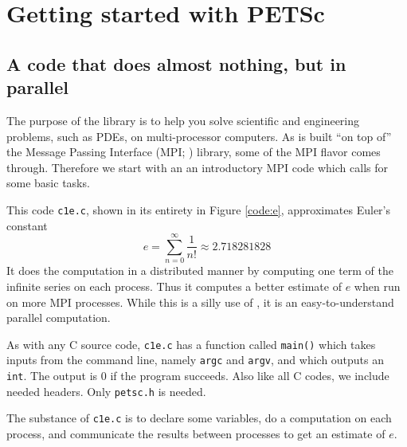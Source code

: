 
\chapter{Getting started with PETSc}
\label{chap:getstarted}

\section{A code that does almost nothing, but in parallel}

The purpose of the \PETSc library is to help you solve scientific and engineering problems, such as PDEs, on multi-processor computers.  As \PETSc is built ``on top of'' the Message Passing Interface (MPI; \citep{Groppetal1999}) library, some of the MPI flavor comes through.  Therefore we start with an an introductory MPI code which calls \PETSc for some basic tasks.

This code \texttt{c1e.c}, shown in its entirety in Figure \ref{code:e}, approximates Euler's constant
\begin{equation}
e = \sum_{n = 0}^\infty \frac{1}{n!} \approx 2.718281828 \label{introeseries}
\end{equation}
It does the computation in a distributed manner by computing one term of the infinite series on each process.  Thus it computes a better estimate of $e$ when run on more MPI processes. While this is a silly use of \PETSc, it is an easy-to-understand parallel computation.

As with any C source code, \texttt{c1e.c} has a function called \texttt{main()} which takes inputs from the command line, namely \texttt{argc} and \texttt{argv}, and which outputs an \texttt{int}.  The output is $0$ if the program succeeds.  Also like all C codes, we include needed headers.  Only \texttt{petsc.h} is needed.

The substance of \texttt{c1e.c} is to declare some variables, do a computation on each process, and communicate the results between processes to get an estimate of $e$.

